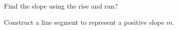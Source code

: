 \documentclass[12pt, a4paper, addpoints]{exam}
\newcommand{\linesegment}[6]{%
\begin{tikzpicture}
    \draw[step=1cm, gray, very thin] (0,0) grid (#1,#2);
    
    \draw[black, thick] (#3,#4) -- (#5,#6);

    \filldraw [black] (#3,#4) circle (2pt); %
    \filldraw [black] (#5,#6) circle (2pt); %
\end{tikzpicture}
}
\begin{document}
\begin{questions}

\question Find the slope using the rise and run?
\begin{multicols}{3}
\end{multicols}

\question 
Construct a line segment to represent a positive slope \(m\).

\begin{multicols}{3}
\end{multicols}

\end{questions}
\end{document}
